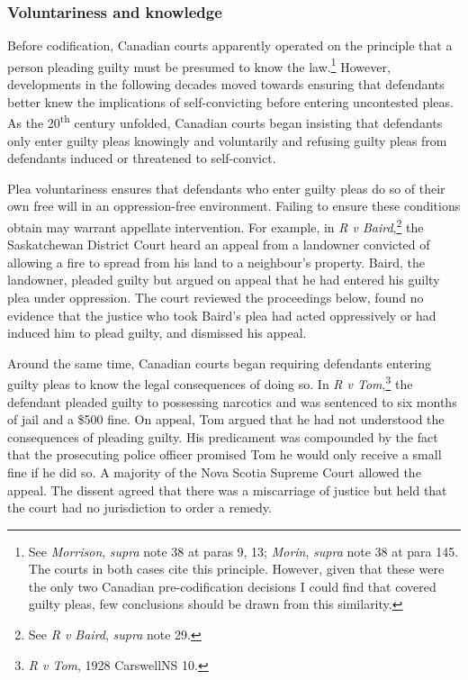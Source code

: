 \subsubsection{Voluntariness and knowledge}

Before codification, Canadian courts apparently operated on the principle that a person pleading guilty must be presumed to know the law.\footnote{See \textit{Morrison}, \textit{supra} note 38 at paras 9, 13; \textit{Morin}, \textit{supra} note 38 at para 145. The courts in both cases cite this principle. However, given that these were the only two Canadian pre-codification decisions I could find that covered guilty pleas, few conclusions should be drawn from this similarity.} However, developments in the following decades moved towards ensuring that defendants better knew the implications of self-convicting before entering uncontested pleas. As the 20\textsuperscript{th} century unfolded, Canadian courts began insisting that defendants only enter guilty pleas knowingly and voluntarily and refusing guilty pleas from defendants induced or threatened to self-convict.

Plea voluntariness ensures that defendants who enter guilty pleas do so of their own free will in an oppression-free environment. Failing to ensure these conditions obtain may warrant appellate intervention. For example, in \textit{R v Baird},\footnote{See \textit{R v Baird}, \textit{supra} note 29.} the Saskatchewan District Court heard an appeal from a landowner convicted of allowing a fire to spread from his land to a neighbour's property. Baird, the landowner, pleaded guilty but argued on appeal that he had entered his guilty plea under oppression. The court reviewed the proceedings below, found no evidence that the justice who took Baird's plea had acted oppressively or had induced him to plead guilty, and dismissed his appeal. 

Around the same time, Canadian courts began requiring defendants entering guilty pleas to know the legal consequences of doing so. In \textit{R v Tom},\footnote{\textit{R v Tom}, 1928 CarswellNS 10.} the defendant pleaded guilty to possessing narcotics and was sentenced to six months of jail and a \$500 fine. On appeal, Tom argued that he had not understood the consequences of pleading guilty. His predicament was compounded by the fact that the prosecuting police officer promised Tom he would only receive a small fine if he did so. A majority of the Nova Scotia Supreme Court allowed the appeal. The dissent agreed that there was a miscarriage of justice but held that the court had no jurisdiction to order a remedy. 

